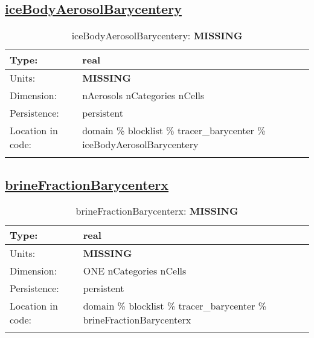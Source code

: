 \subsection[iceBodyAerosolBarycentery]{\hyperref[sec:var_tab_tracer_barycenter]{iceBodyAerosolBarycentery}}
\label{subsec:var_sec_tracer_barycenter_iceBodyAerosolBarycentery}
\begin{center}
\begin{longtable}{| p{2.0in} | p{4.0in} |}
        \hline 
        Type: & real \\
        \hline 
        Units: & {\bf \color{red} MISSING} \\
        \hline 
        Dimension: & nAerosols nCategories nCells \\
        \hline 
        Persistence: & persistent \\
        \hline 
         Location in code: & domain \% blocklist \% tracer\_barycenter \% iceBodyAerosolBarycentery \\
         \hline 
    \caption{iceBodyAerosolBarycentery: {\bf \color{red} MISSING}}
\end{longtable}
\end{center}
\subsection[brineFractionBarycenterx]{\hyperref[sec:var_tab_tracer_barycenter]{brineFractionBarycenterx}}
\label{subsec:var_sec_tracer_barycenter_brineFractionBarycenterx}
\begin{center}
\begin{longtable}{| p{2.0in} | p{4.0in} |}
        \hline 
        Type: & real \\
        \hline 
        Units: & {\bf \color{red} MISSING} \\
        \hline 
        Dimension: & ONE nCategories nCells \\
        \hline 
        Persistence: & persistent \\
        \hline 
         Location in code: & domain \% blocklist \% tracer\_barycenter \% brineFractionBarycenterx \\
         \hline 
    \caption{brineFractionBarycenterx: {\bf \color{red} MISSING}}
\end{longtable}
\end{center}

